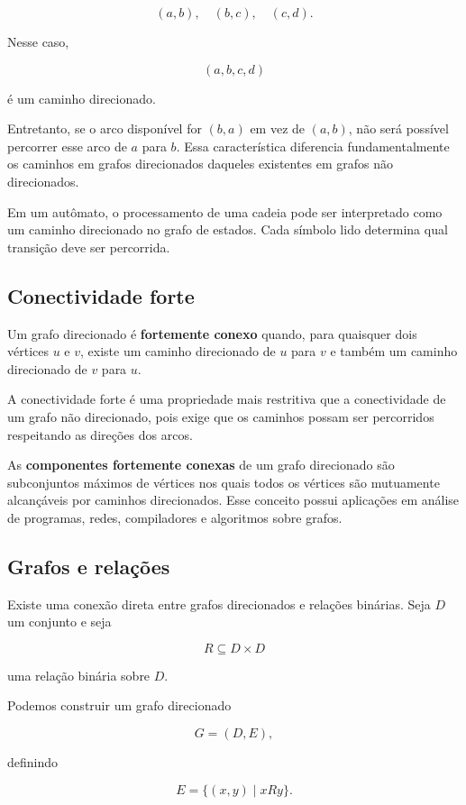 \documentclass[
  brazilian,
  letterpaper,
]{book}
\theoremstyle{plain}
\theoremstyle{definition}
\theoremstyle{remark}
\begin{document}
\[
(a,b),\quad
(b,c),\quad
(c,d).
\]

Nesse caso,

\[
(a,b,c,d)
\]

é um caminho direcionado.

Entretanto, se o arco disponível for \((b,a)\) em vez de \((a,b)\), não
será possível percorrer esse arco de \(a\) para \(b\). Essa
característica diferencia fundamentalmente os caminhos em grafos
direcionados daqueles existentes em grafos não direcionados.

Em um autômato, o processamento de uma cadeia pode ser interpretado como
um caminho direcionado no grafo de estados. Cada símbolo lido determina
qual transição deve ser percorrida.

\subsection{Conectividade forte}\label{conectividade-forte}

Um grafo direcionado é \textbf{fortemente conexo} quando, para quaisquer
dois vértices \(u\) e \(v\), existe um caminho direcionado de \(u\) para
\(v\) e também um caminho direcionado de \(v\) para \(u\).

A conectividade forte é uma propriedade mais restritiva que a
conectividade de um grafo não direcionado, pois exige que os caminhos
possam ser percorridos respeitando as direções dos arcos.

As \textbf{componentes fortemente conexas} de um grafo direcionado são
subconjuntos máximos de vértices nos quais todos os vértices são
mutuamente alcançáveis por caminhos direcionados. Esse conceito possui
aplicações em análise de programas, redes, compiladores e algoritmos
sobre grafos.

\subsection{Grafos e relações}\label{grafos-e-relauxe7uxf5es}

Existe uma conexão direta entre grafos direcionados e relações binárias.
Seja \(D\) um conjunto e seja

\[
R\subseteq D\times D
\]

uma relação binária sobre \(D\).

Podemos construir um grafo direcionado

\[
G=(D,E),
\]

definindo

\[
E=\{(x,y)\mid xRy\}.
\]
\end{document}
